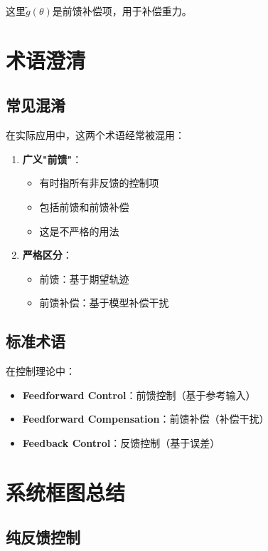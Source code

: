 \documentclass[12pt,a4paper]{article}
\begin{document}
这里$\tilde{g}(\theta)$是前馈补偿项，用于补偿重力。

\section{术语澄清}

\subsection{常见混淆}

在实际应用中，这两个术语经常被混用：

\begin{enumerate}
\item \textbf{广义"前馈"}：
\begin{itemize}
\item 有时指所有非反馈的控制项
\item 包括前馈和前馈补偿
\item 这是不严格的用法
\end{itemize}

\item \textbf{严格区分}：
\begin{itemize}
\item 前馈：基于期望轨迹
\item 前馈补偿：基于模型补偿干扰
\end{itemize}
\end{enumerate}

\subsection{标准术语}

在控制理论中：
\begin{itemize}
\item \textbf{Feedforward Control}：前馈控制（基于参考输入）
\item \textbf{Feedforward Compensation}：前馈补偿（补偿干扰）
\item \textbf{Feedback Control}：反馈控制（基于误差）
\end{itemize}

\section{系统框图总结}

\subsection{纯反馈控制}
\end{document}
